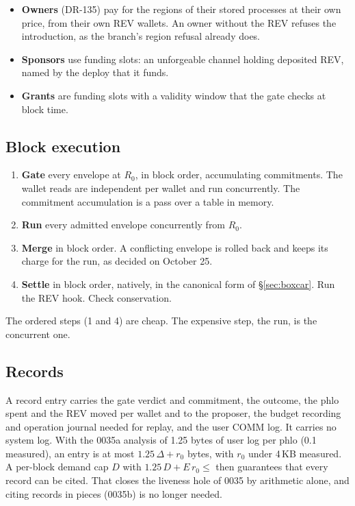\documentclass[11pt]{article}
\newcommand{\code}{\path}
\begin{document}
\begin{itemize}
\item \textbf{Owners} (DR-135) pay for the regions of their stored processes at their own price, from their own REV wallets. An owner without the REV refuses the introduction, as the branch's region refusal already does.
\item \textbf{Sponsors} use funding slots: an unforgeable channel holding deposited REV, named by the deploy that it funds.
\item \textbf{Grants} are funding slots with a validity window that the gate checks at block time.
\end{itemize}

\subsection{Block execution}

\begin{enumerate}
\item \textbf{Gate} every envelope at $R_0$, in block order, accumulating commitments. The wallet reads are independent per wallet and run concurrently. The commitment accumulation is a pass over a table in memory.
\item \textbf{Run} every admitted envelope concurrently from $R_0$.
\item \textbf{Merge} in block order. A conflicting envelope is rolled back and keeps its charge for the run, as decided on October 25.
\item \textbf{Settle} in block order, natively, in the canonical form of \S\ref{sec:boxcar}. Run the REV hook. Check conservation.
\end{enumerate}
The ordered steps (1 and 4) are cheap. The expensive step, the run, is the concurrent one.

\subsection{Records}

A record entry carries the gate verdict and commitment, the outcome, the phlo spent and the REV moved per wallet and to the proposer, the budget recording and operation journal needed for replay, and the user COMM log. It carries no system log. With the 0035a analysis of 1.25 bytes of user log per phlo (0.1 measured), an entry is at most $1.25\,\Delta + r_0$ bytes, with $r_0$ under 4\,KB measured. A per-block demand cap $D$ with $1.25\,D + E\,r_0 \le$ \code{block-record-bytes} then guarantees that every record can be cited. That closes the liveness hole of 0035 by arithmetic alone, and citing records in pieces (0035b) is no longer needed.
\end{document}
